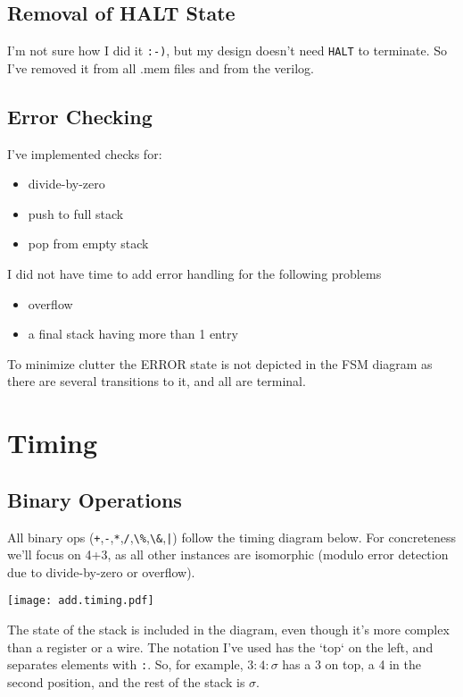 \documentclass{article}
\begin{document}
\subsection{Removal of HALT State}

I'm not sure how I did it \verb':-)',
but my design doesn't need \verb'HALT' to terminate.
So I've removed it from all .mem files and from the
verilog.

\subsection{Error Checking}
I've implemented checks for:
\begin{itemize}
\item divide-by-zero
\item push to full stack
\item pop from empty stack
\end{itemize}

I did not have time to add error handling for the following problems
\begin{itemize}
\item overflow
\item a final stack having more than 1 entry
\end{itemize}

To minimize clutter the ERROR state is not depicted in the FSM diagram as there are several transitions to it,
and all are terminal.
\section{Timing}
\subsection{Binary Operations}

All binary ops (\verb'+',\verb'-',\verb'*',\verb'/',\verb'\%',\verb'\&',\verb'|') follow the timing diagram below.
For concreteness we'll focus on 4+3, as all other instances
are isomorphic (modulo error detection due to divide-by-zero or overflow).

\begin{center}
\texttt{[image: add.timing.pdf]}
\end{center}

The state of the stack is included in the diagram, even though it's more complex than a register or a wire.
The notation I've used has the `top` on the left, and separates elements with \verb':'.
So, for example, $3:4:\sigma$ has a 3 on top, a 4 in the second position, and the rest of the stack is $\sigma$.
\end{document}
